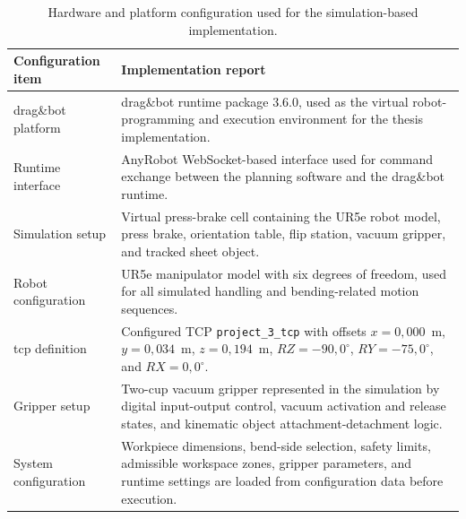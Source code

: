 \begin{table}[htbp]
\centering
\normalsize
\setlength{\tabcolsep}{4pt}
\renewcommand{\arraystretch}{1.12}
\begin{tabularx}{\textwidth}{L{4.0cm} Y}
\hline
\textbf{Configuration item} & \textbf{Implementation report} \\
\hline
drag\&bot platform &
drag\&bot runtime package 3.6.0, used as the virtual robot-programming and
execution environment for the thesis implementation. \\
\hline
Runtime interface &
AnyRobot WebSocket-based interface used for command exchange between the
planning software and the drag\&bot runtime. \\
\hline
Simulation setup &
Virtual press-brake cell containing the UR5e robot model, press brake,
orientation table, flip station, vacuum gripper, and tracked sheet object. \\
\hline
Robot configuration &
UR5e manipulator model with six degrees of freedom, used for
all simulated handling and bending-related motion sequences. \\
\hline
\ac{tcp} definition &
Configured TCP \texttt{project\_3\_tcp} with offsets
$x = 0{,}000$~m, $y = 0{,}034$~m, $z = 0{,}194$~m,
$RZ = -90{,}0^\circ$, $RY = -75{,}0^\circ$, and $RX = 0{,}0^\circ$. \\
\hline
Gripper setup &
Two-cup vacuum gripper represented in the simulation by digital input-output
control, vacuum activation and release states, and kinematic object
attachment-detachment logic. \\
\hline
System configuration &
Workpiece dimensions, bend-side selection, safety limits, admissible workspace
zones, gripper parameters, and runtime settings are loaded from configuration
data before execution. \\
\hline
\end{tabularx}
\caption{Hardware and platform configuration used for the simulation-based implementation.}
\label{tab:hardware-implementation-report}
\end{table}
